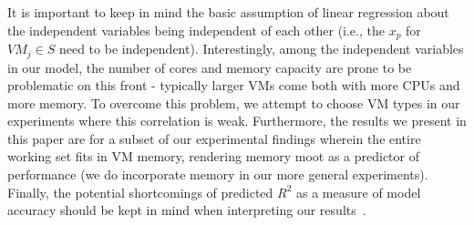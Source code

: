 It is important to keep in mind the basic assumption of linear regression about the independent variables being independent of each other (i.e., the $x_p$ for $VM_j\in S$ need to be independent). Interestingly, among the independent
variables in our model, the number of cores and memory capacity are prone to be problematic on this front - typically
larger VMs come both with more CPUs and more memory. To overcome this problem, we attempt to choose VM types
in our experiments where this correlation is weak. Furthermore, the results we present in this paper are for a subset
of our experimental findings wherein the entire working set fits in VM memory, rendering memory moot as a predictor of
performance (we do incorporate memory in our more general experiments). Finally, the potential shortcomings of predicted 
$R^2$ as a measure of model accuracy should be kept in mind when interpreting our results~\cite{CMUStatsBook}. 
  
  

